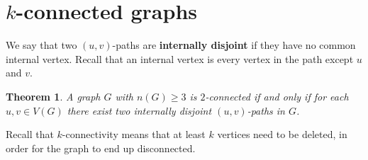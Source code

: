 \documentclass{Book}
\newtheorem{theorem}{Theorem}
\begin{document}
\section{$k$-connected graphs}%
\label{sec:4.2}

We say that two $(u,v)$-paths are \textbf{internally disjoint} if they have no common internal vertex. Recall that an internal vertex is every vertex in the path except $u$ and $v$.

\begin{theorem}
	\label{the:4.2.2}
	A graph $G$ with $n(G) \ge 3$ is $2$-connected if and only if for each $u,v \in V(G)$ there exist two internally disjoint $(u,v)$-paths in $G$.
\end{theorem}
Recall that $k$-connectivity means that at least $k$ vertices need to be deleted, in order for the graph to end up disconnected.
\end{document}
